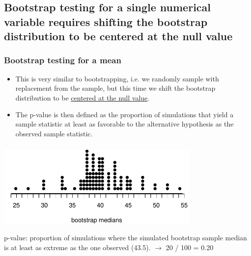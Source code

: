 \documentclass[11pt,containsverbatim,handout,xcolor=xelatex,dvipsnames,table]{beamer}
\begin{document}

\subsection{Bootstrap testing for a single numerical variable requires shifting the
bootstrap distribution to be centered at the null value}
\label{mi4}


\begin{frame}
\frametitle{Bootstrap testing for a mean}

\begin{itemize}

\item This is very similar to bootstrapping, i.e. we randomly sample with replacement from the sample, 
but this time we shift the bootstrap distribution to be \underline{centered at the null value}. 

\pause

\item The p-value is then defined as the proportion of simulations that yield a sample statistic at least as 
favorable to the alternative hypothesis as the observed sample statistic.

\end{itemize}

\end{frame}


\begin{frame}
\frametitle{}


\begin{center}
\includegraphics[width = 0.75\textwidth]{figures/movies/horror_boot_med_test_dot}
\end{center}

\pause

{
\pause
p-value: proportion of simulations where the simulated bootstrap sample median is at least as extreme as the 
one observed (43.5). $\rightarrow$ 20 / 100 = 0.20
}

\end{frame}
\end{document}
